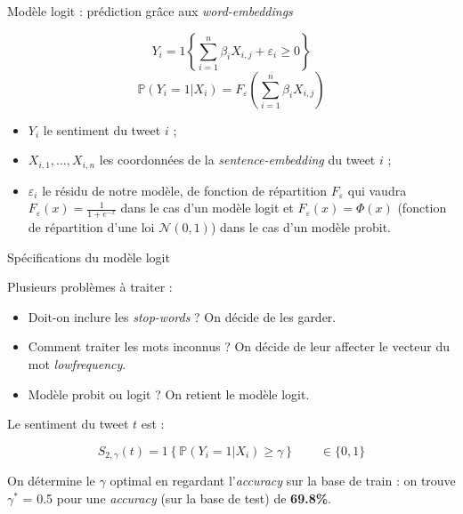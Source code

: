 \documentclass[10pt,xcolor=table,color={dvipsnames,usenames},ignorenonframetext,usepdftitle=false,french]{beamer}
\begin{document}
\begin{frame}{Modèle logit : prédiction grâce aux
\emph{word-embeddings}}

\[
Y_i = 1\left\{ \sum_{i = 1}^n \beta_i X_{i,j} + \varepsilon_i \geq 0 \right\} 
\] \[
\mathbb{P}(Y_i = 1 | X_{i}) = F_{\varepsilon}\left(\sum_{i = 1}^n \beta_i X_{i,j}\right)
\]

\begin{itemize}
\item $Y_i$ le sentiment du tweet $i$ ;
\item $X_{i,1}, \dots, X_{i,n}$ les coordonnées de la \emph{sentence-embedding} du tweet $i$ ;
\item $\varepsilon_i$ le résidu de notre modèle, de fonction de répartition $F_{\varepsilon}$ qui vaudra $F_{\varepsilon}(x) = \frac{1}{1 + e^{-x}}$ dans le cas d'un modèle logit et $F_{\varepsilon}(x) = \Phi(x)$ (fonction de répartition d'une loi $\mathcal{N}(0, 1)$) dans le cas d'un modèle probit. 
\end{itemize}

\end{frame}

\begin{frame}{Spécifications du modèle logit}

Plusieurs problèmes à traiter :

\begin{itemize}
\item
  Doit-on inclure les \emph{stop-words} ? \faArrowCircleRight{} On
  décide de les garder.
\item
  Comment traiter les mots inconnus ? \faArrowCircleRight{} On décide de
  leur affecter le vecteur du mot \emph{lowfrequency}.
\item
  Modèle probit ou logit ? \faArrowCircleRight{} On retient le modèle
  logit.
\end{itemize}

Le sentiment du tweet \(t\) est :

\[S_{2,\gamma}(t) = 1\left\{   \mathbb{P}(Y_i = 1 | X_{i}) \ge \gamma\right\} \qquad \in \{0,1\}\]

On détermine le \(\gamma\) optimal en regardant l'\emph{accuracy} sur la
base de train : on trouve \(\gamma^*\) = 0.5 pour une \emph{accuracy}
(sur la base de test) de \textbf{69.8\%}.

\end{frame}
\end{document}
